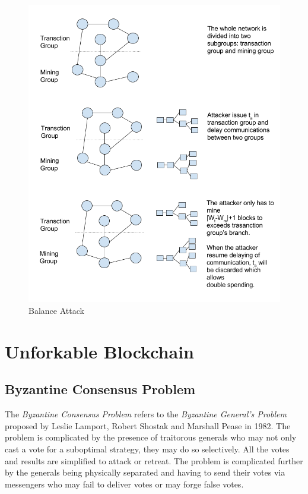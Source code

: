 \documentclass[12pt]{article}
\begin{document}
\begin{figure}
    \includegraphics{balance_attack.png}
    \caption{Balance Attack}
    \label{fig:balance_attack}
\end{figure}

\section{Unforkable Blockchain}
\label{sec:Unforkable Blockchain}

\subsection{Byzantine Consensus Problem}

The \textit{Byzantine Consensus Problem} refers to the \textit{Byzantine General's Problem} proposed by Leslie Lamport, Robert Shostak and Marshall Pease in 1982. The problem is complicated by the presence of traitorous generals who may not only cast a vote for a suboptimal strategy, they may do so selectively. All the votes and results are simplified to attack or retreat. The problem is complicated further by the generals being physically separated and having to send their votes via messengers who may fail to deliver votes or may forge false votes\cite{lamport1982byzantine}.
\end{document}
